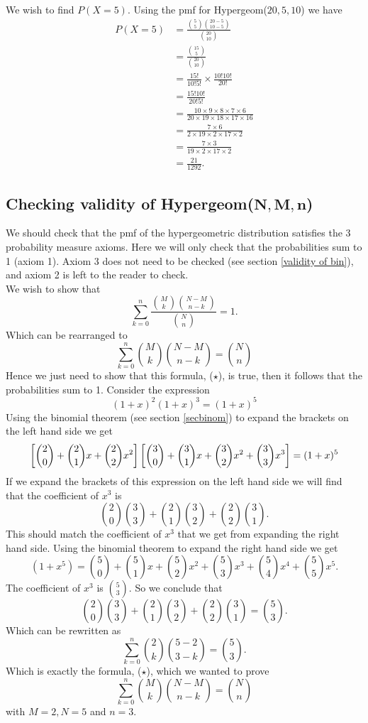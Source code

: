 \noindent We wish to find $P(X = 5)$. Using the pmf for Hypergeom($20,5,10$) we have
\begin{align*}
P(X = 5) & = \frac{\displaystyle{\binom{5}{5}\binom{20-5}{10-5}}}{\displaystyle{\binom{20}{10}}} \\
	     & = \frac{\binom{15}{5}}{\binom{20}{10}} \\
	     & = \frac{15!}{10!5!}\times\frac{10!10!}{20!} \\
	     & = \frac{15!10!}{20!5!} \\
	     & = \frac{10\times9\times8\times7\times6}{20\times19\times18\times17\times16} \tag{cancelling common factors} \\
	     & = \frac{7\times6}{2\times19\times2\times17\times2} \tag{cancelling common factors} \\
	     & = \frac{7\times3}{19\times2\times17\times2} \tag{cancelling common factors} \\
	     & = \frac{21}{1292}.
\end{align*}


\subsection{Checking validity of Hypergeom($\boldsymbol{N,M,n}$)}
We should check that the pmf of the hypergeometric distribution satisfies the 3 probability measure axioms. Here we will only check that the probabilities sum to 1 (axiom 1). Axiom 3 does not need to be checked (see section \ref{validity of bin}), and axiom 2 is left to the reader to check. \\

\noindent We wish to show that
\[
\sum_{k=0}^n \frac{\binom{M}{k}\binom{N-M}{n-k}}{\binom{N}{n}} = 1.
\]
Which can be rearranged to
\[
\sum_{k=0}^n \binom{M}{k}\binom{N-M}{n-k} = \binom{N}{n} \tag{$\star$}
\]
Hence we just need to show that this formula, ($\star$), is true, then it follows that the probabilities sum to 1. 
Consider the expression
\[
(1+x)^2(1+x)^3 = (1+x)^5 \tag{using index laws}
\]
Using the binomial theorem (see section \ref{secbinom}) to expand the brackets on the left hand side we get
\[
\left[\binom{2}{0} + \binom{2}{1}x + \binom{2}{2}x^2\right]\left[\binom{3}{0} + \binom{3}{1}x + \binom{3}{2}x^2 + \binom{3}{3}x^3\right] = (1+x)^5
\]
If we expand the brackets of this expression on the left hand side we will find that the coefficient of $x^3$ is
\[
\binom{2}{0}\binom{3}{3} + \binom{2}{1}\binom{3}{2} + \binom{2}{2}\binom{3}{1}.
\]
This should match the coefficient of $x^3$ that we get from expanding the right hand side. Using the binomial theorem to expand the right hand side we get
\[
(1+x^5) = \binom{5}{0} + \binom{5}{1}x + \binom{5}{2}x^2 + \binom{5}{3}x^3 + \binom{5}{4}x^4 + \binom{5}{5}x^5. 
\]
The coefficient of $x^3$ is $\binom{5}{3}$. So we conclude that
\[
\binom{2}{0}\binom{3}{3} + \binom{2}{1}\binom{3}{2} + \binom{2}{2}\binom{3}{1} = \binom{5}{3}.
\]
Which can be rewritten as
\[
\sum_{k = 0}^n \binom{2}{k}\binom{5-2}{3-k} = \binom{5}{3}.
\]
Which is exactly the formula, ($\star$), which we wanted to prove
\[
\sum_{k=0}^n \binom{M}{k}\binom{N-M}{n-k} = \binom{N}{n}
\]
with $M = 2, N = 5$ and $n = 3$. \\

